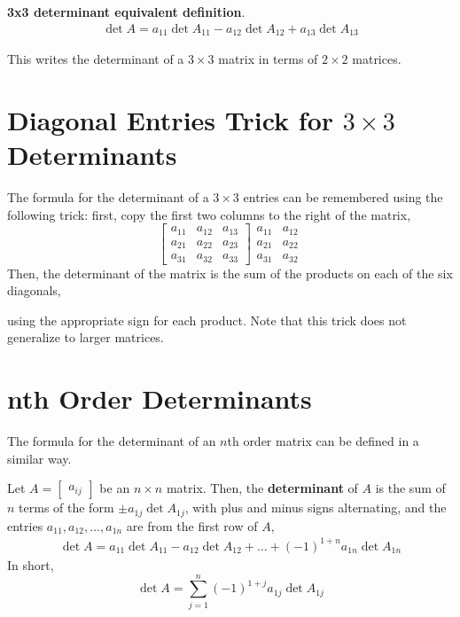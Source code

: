 \documentclass[letterpaper,12pt]{article}
\begin{document}
\begin{theorem}
\textbf{3x3 determinant equivalent definition}.
\begin{align*}
    \boxed{\det{A} = a_{11} \det{A_{11}} - a_{12} \det{A_{12}} + a_{13} \det{A_{13}}}
\end{align*}
\end{theorem}

This writes the determinant of a $3 \times 3$ matrix in terms of $2 \times 2$ matrices.

\section*{Diagonal Entries Trick for $3 \times 3$ Determinants}
The formula for the determinant of a $3 \times 3$ entries can be remembered using the following trick: first, copy the first two columns to the right of the matrix,
\begin{equation*}
    \begin{bmatrix} a_{11} & a_{12} & a_{13} \\
    a_{21} & a_{22} & a_{23} \\
    a_{31} & a_{32} & a_{33} \end{bmatrix} \begin{matrix} a_{11} & a_{12} \\ a_{21} & a_{22} \\ a_{31} & a_{32} \end{matrix}
\end{equation*}
Then, the determinant of the matrix is the sum of the products on each of the six diagonals,

\begin{figure}[H]
    \centering
    \def\svgwidth{0.4\linewidth}
    
\end{figure}
using the appropriate sign for each product. Note that this trick does not generalize to larger matrices.


\section*{nth Order Determinants}
The formula for the determinant of an $n$th order matrix can be defined in a similar way.

\begin{definition}
Let $A = \begin{bmatrix} a_{ij} \end{bmatrix}$ be an $n \times n$ matrix. Then, the \textbf{determinant} of $A$ is the sum of $n$ terms of the form $\pm a_{1j} \det{A_{1j}}$, with plus and minus signs alternating, and the entries $a_{11}, a_{12}, \dots, a_{1n}$ are from the first row of $A$,
\begin{align*}
    \boxed{\det{A} = a_{11} \det{A_{11}} - a_{12} \det{A_{12}} + \dots + (-1)^{1+n} a_{1n} \det{A_{1n}}}
\end{align*}
In short,
\begin{equation*}
    \boxed{\det{A} = \sum_{j=1}^n (-1)^{1+j} a_{1j} \det{A_{1j}}}
\end{equation*}
\end{definition}
\end{document}
